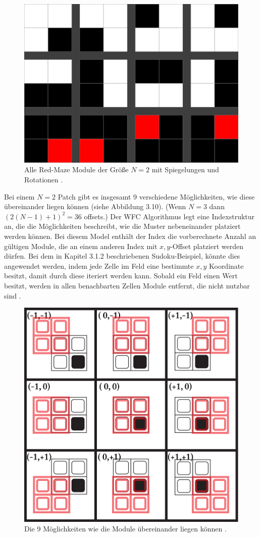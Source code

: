\documentclass[12pt, a4paper,twoside,openany]{report} %
\begin{document}
\begin{figure}[H]
    \centering
    \includegraphics[width=0.5\linewidth]{images/red-maze-modules.jpg}%
    \caption{Alle Red-Maze Module der Größe $N = 2$ mit Spiegelungen und Rotationen \cite{Karth2017WaveFunctionCollapseIC}.}%
\end{figure}

Bei einem $N = 2$ Patch gibt es insgesamt 9 verschiedene Möglichkeiten, wie diese übereinander liegen können {(siehe Abbildung 3.10)}.
{(Wenn $N = 3$ dann $(2(N - 1) + 1)^2 = 36$ offsets.)}
Der WFC Algorithmus legt eine Indexstruktur an, die die Möglichkeiten beschreibt, wie die Muster nebeneinander platziert werden können.
Bei diesem Model enthält der Index die vorberechnete Anzahl an gültigen Module, die an einem anderen Index mit $x,y$-Offset platziert werden dürfen. 
Bei dem in Kapitel 3.1.2 beschriebenen Sudoku-Beispiel, könnte dies angewendet werden,
indem jede Zelle im Feld eine bestimmte $x,y$ Koordinate besitzt, damit durch diese iteriert werden kann.
Sobald ein Feld einen Wert besitzt, werden in allen benachbarten Zellen Module entfernt, die nicht nutzbar sind \cite{Karth2017WaveFunctionCollapseIC}.

\begin{figure}[H]
    \centering
    \includegraphics[width=0.5\linewidth]{images/red-maze-offset.png}%
    \caption{Die 9 Möglichkeiten wie die Module übereinander liegen können \cite{Karth2017WaveFunctionCollapseIC}.}%
\end{figure}
\end{document}
